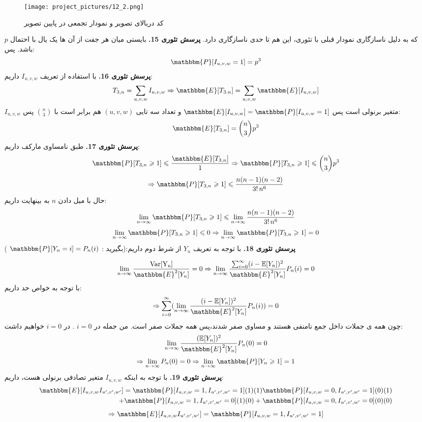 \documentclass[11pt]{article}
\begin{document}
\begin{persian}
\begin{figure}[H]
\centerline{\texttt{[image: project\_pictures/12\_2.png]}}
\caption{کد دربالای تصویر و نمودار تجمعی در پایین تصویر }
\end{figure}
که به دلیل ناسازگاری نمودار قبلی با تئوری، این هم تا حدی ناسازگاری دارد.
\newline
\textbf{پرسش تئوری 15.}
بایستی میان هر جفت از آن ها یک یال با احتمال $p$ باشد. پس:
$$
\mathbbm{P}[I_{u,v,w} = 1] = p^3
$$
\newline
\textbf{پرسش تئوری 16.}
با استفاده از تعریف 
$I_{u,v,w}$
داریم:
$$
T_{3,n} = \sum_{u,v,w} I_{u,v,w} \Rightarrow \mathbbm{E}[T_{3.n}] = \sum_{u,v,w} \mathbbm{E}[I_{u,v,w}]
$$
$I_{u,v,w}$
متغیر برنولی است پس 
$\mathbbm{E}[I_{u,v,w}] = \mathbbm{P}[I_{u,v,w} = 1]$
و تعداد سه تایی 
$(u,v,w)$
هم برابر است با 
${n \choose 3}$
پس:
$$
\mathbbm{E}[T_{3,n}] = {n \choose 3} p^3
$$
\newline
\textbf{پرسش تئوری 17.}
طبق نامساوی مارکف داریم:
$$
\mathbbm{P}[T_{3,n} \geqslant 1] \leqslant \frac{\mathbbm{E}[T_{3,n}]}{1} \Rightarrow \mathbbm{P}[T_{3,n}  \geqslant 1] \leqslant {n \choose 3} p^3
$$
$$
\Rightarrow \mathbbm{P}[T_{3,n}  \geqslant 1] \leqslant \frac{n(n-1)(n-2)}{3!\,n^6}
$$
حال با میل دادن $n$ به بینهایت داریم:
$$
\lim_{n \to \infty} \mathbbm{P}[T_{3,n}  \geqslant 1] \leqslant \lim_{n \to \infty} \frac{n(n-1)(n-2)}{3!\,n^6} 
$$
$$
\lim_{n \to \infty} \mathbbm{P}[T_{3,n} \geqslant 1] \leqslant 0 \Rightarrow \lim_{n \to \infty} \mathbbm{P}[T_{3,n}  \geqslant 1] = 0
$$
\newline
\textbf{پرسش تئوری 18.}
با توجه به تعریف $Y_n$  از شرط دوم داریم:(بگیرید :
$\mathbbm{P}[Y_n=i] = P_n(i)$
)

$$
\lim_{n \to \infty} \frac{\mathrm{Var[Y_n]}}{\mathbbm{E}^2[Y_n]} = 0 \Rightarrow \lim_{n \to \infty} \frac{\sum_{i=0}^{\infty} (i-\mathbb{E}[Y_n])^2}{\mathbbm{E}^2[Y_n]}P_n(i) = 0
$$
با توجه به خواص حد داریم:
$$
\Rightarrow  \sum_{i=0}^{\infty} (\lim_{n \to \infty} \frac{(i-\mathbb{E}[Y_n])^2}{\mathbbm{E}^2[Y_n]}P_n(i)) = 0
$$
چون همه ی جملات داخل جمع نامنفی هستند و مساوی صفر شدند،پس همه جملات صفر است. من جمله در 
$i = 0$
. در $i=0$ خواهیم داشت:
$$\lim_{n \to \infty}\frac{(\mathbb{E}[Y_n])^2}{\mathbbm{E}^2[Y_n]}P_n(0) = 0
$$
$$
\Rightarrow \lim_{n \to \infty} P_n(0) = 0 
\Rightarrow \lim_{n \to \infty} \mathbbm{P}[Y_n \geqslant 1] = 1
$$
\newline
\textbf{پرسش تئوری 19.}
با توجه به اینکه 
$I_{u,v,w}$
متغیر تصادفی برنولی هست، داریم:
\begin{align*}
\mathbbm{E}[I_{u,v,w}I_{u',v',w'}] =\mathbbm{P}[I_{u,v,w} = 1,I_{u',v',w'}=1](1)(1)
\mathbbm{P}[I_{u,v,w} = 0,I_{u',v',w'}=1](0)(1) \\
 + \mathbbm{P}[I_{u,v,w} = 1,I_{u',v',w'}=0](1)(0) + \mathbbm{P}[I_{u,v,w} = 0,I_{u',v',w'}=0](0)(0)
\end{align*}
$$
\Rightarrow \mathbbm{E}[I_{u,v,w}I_{u',v',w'}] =\mathbbm{P}[I_{u,v,w} = 1,I_{u',v',w'}=1]
$$


\end{persian}
\end{document}
